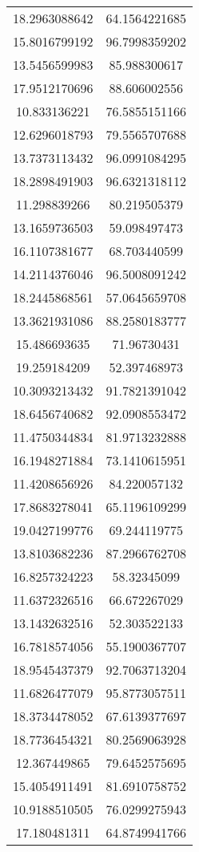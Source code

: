 \begin{table}
\begin{tabular}{cc}
18.2963088642 & 64.1564221685 \\
15.8016799192 & 96.7998359202 \\
13.5456599983 & 85.988300617 \\
17.9512170696 & 88.606002556 \\
10.833136221 & 76.5855151166 \\
12.6296018793 & 79.5565707688 \\
13.7373113432 & 96.0991084295 \\
18.2898491903 & 96.6321318112 \\
11.298839266 & 80.219505379 \\
13.1659736503 & 59.098497473 \\
16.1107381677 & 68.703440599 \\
14.2114376046 & 96.5008091242 \\
18.2445868561 & 57.0645659708 \\
13.3621931086 & 88.2580183777 \\
15.486693635 & 71.96730431 \\
19.259184209 & 52.397468973 \\
10.3093213432 & 91.7821391042 \\
18.6456740682 & 92.0908553472 \\
11.4750344834 & 81.9713232888 \\
16.1948271884 & 73.1410615951 \\
11.4208656926 & 84.220057132 \\
17.8683278041 & 65.1196109299 \\
19.0427199776 & 69.244119775 \\
13.8103682236 & 87.2966762708 \\
16.8257324223 & 58.32345099 \\
11.6372326516 & 66.672267029 \\
13.1432632516 & 52.303522133 \\
16.7818574056 & 55.1900367707 \\
18.9545437379 & 92.7063713204 \\
11.6826477079 & 95.8773057511 \\
18.3734478052 & 67.6139377697 \\
18.7736454321 & 80.2569063928 \\
12.367449865 & 79.6452575695 \\
15.4054911491 & 81.6910758752 \\
10.9188510505 & 76.0299275943 \\
17.180481311 & 64.8749941766 \\

\end{tabular}
\end{table}
